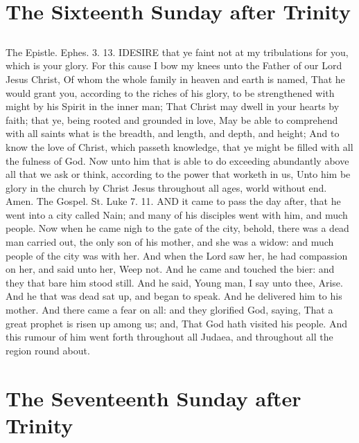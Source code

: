 \section{The Sixteenth Sunday after Trinity}
\subsection{}

The Epistle. Ephes. 3. 13.
IDESIRE that ye faint not at my tribulations for you, which is your glory. For this cause I bow my knees unto the Father of our Lord Jesus Christ, Of whom the whole family in heaven and earth is named, That he would grant you, according to the riches of his glory, to be strengthened with might by his Spirit in the inner man; That Christ may dwell in your hearts by faith; that ye, being rooted and grounded in love, May be able to comprehend with all saints what is the breadth, and length, and depth, and height; And to know the love of Christ, which passeth knowledge, that ye might be filled with all the fulness of God. Now unto him that is able to do exceeding abundantly above all that we ask or think, according to the power that worketh in us, Unto him be glory in the church by Christ Jesus throughout all ages, world without end. Amen.
The Gospel. St. Luke 7. 11.
AND it came to pass the day after, that he went into a city called Nain; and many of his disciples went with him, and much people. Now when he came nigh to the gate of the city, behold, there was a dead man carried out, the only son of his mother, and she was a widow: and much people of the city was with her. And when the Lord saw her, he had compassion on her, and said unto her, Weep not. And he came and touched the bier: and they that bare him stood still. And he said, Young man, I say unto thee, Arise. And he that was dead sat up, and began to speak. And he delivered him to his mother. And there came a fear on all: and they glorified God, saying, That a great prophet is risen up among us; and, That God hath visited his people. And this rumour of him went forth throughout all Judaea, and throughout all the region round about.

\section{The Seventeenth Sunday after Trinity}
